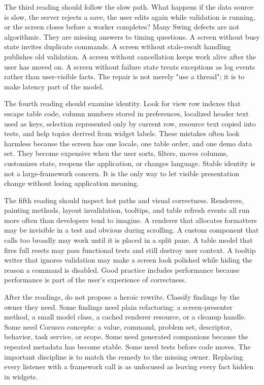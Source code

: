 The third reading should follow the slow path. What happens if the data source
is slow, the server rejects a save, the user edits again while validation is
running, or the screen closes before a worker completes? Many Swing defects are
not algorithmic. They are missing answers to timing questions. A screen without
busy state invites duplicate commands. A screen without stale-result handling
publishes old validation. A screen without cancellation keeps work alive after
the user has moved on. A screen without failure state treats exceptions as log
events rather than user-visible facts. The repair is not merely "use a thread";
it is to make latency part of the model.

The fourth reading should examine identity. Look for view row indexes that
escape table code, column numbers stored in preferences, localized header text
used as keys, selection represented only by current row, resource text copied
into tests, and help topics derived from widget labels. These mistakes often
look harmless because the screen has one locale, one table order, and one demo
data set. They become expensive when the user sorts, filters, moves columns,
customizes state, reopens the application, or changes language. Stable identity
is not a large-framework concern. It is the only way to let visible
presentation change without losing application meaning.

The fifth reading should inspect hot paths and visual correctness. Renderers,
painting methods, layout invalidation, tooltips, and table refresh events all
run more often than developers tend to imagine. A renderer that allocates
formatters may be invisible in a test and obvious during scrolling. A custom
component that calls  too broadly may work until it is placed in a
split pane. A table model that fires full resets may pass functional tests and
still destroy user context. A tooltip writer that ignores validation may make a
screen look polished while hiding the reason a command is disabled. Good
practice includes performance because performance is part of the user's
experience of correctness.

After the readings, do not propose a heroic rewrite. Classify findings by the
owner they need. Some findings need plain refactoring: a screen-presenter method, a
small model class, a cached renderer resource, or a cleanup handle. Some need
Corusco concepts: a value, command, problem set, descriptor, behavior, task
service, or scope. Some need generated companions because the repeated metadata
has become stable. Some need tests before code moves. The important discipline
is to match the remedy to the missing owner. Replacing every listener with a
framework call is as unfocused as leaving every fact hidden in widgets.

